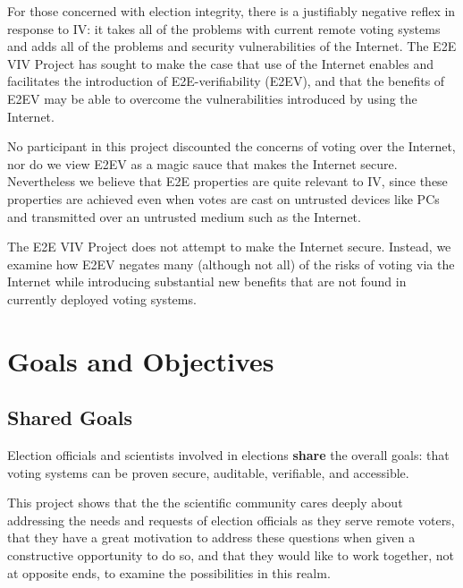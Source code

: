 For those concerned with election integrity, there is a justifiably
negative reflex in response to IV: it takes all of the problems with
current remote voting systems and adds all of the problems and
security vulnerabilities of the Internet. The E2E VIV Project has
sought to make the case that use of the Internet enables and
facilitates the introduction of E2E-verifiability (E2EV), and that the
benefits of E2EV may be able to overcome the vulnerabilities
introduced by using the Internet.

No participant in this project discounted the concerns of voting over
the Internet, nor do we view E2EV as a magic sauce that makes the
Internet secure. Nevertheless we believe that E2E properties are quite
relevant to IV, since these properties are achieved even when votes
are cast on untrusted devices like PCs and transmitted over an
untrusted medium such as the Internet.

The E2E VIV Project does not attempt to make the Internet
secure. Instead, we examine how E2EV negates many (although not all)
of the risks of voting via the Internet while introducing substantial
new benefits that are not found in currently deployed voting systems.

\section{Goals and Objectives}
\label{sec:goals-objectives}

\subsection{Shared Goals}
\label{sec:shared-goals}

Election officials and scientists involved in elections \textbf{share}
the overall goals: that voting systems can be proven secure,
auditable, verifiable, and accessible.

This project shows that the the scientific community cares deeply
about addressing the needs and requests of election officials as they
serve remote voters, that they have a great motivation to address
these questions when given a constructive opportunity to do so, and
that they would like to work together, not at opposite ends, to
examine the possibilities in this realm.

